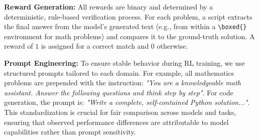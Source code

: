 \textbf{Reward Generation:} All rewards are binary and determined by a deterministic, rule-based verification process. For each problem, a script extracts the final answer from the model's generated text (e.g., from within a \texttt{\textbackslash boxed\{\}} environment for math problems) and compares it to the ground-truth solution. A reward of $1$ is assigned for a correct match and $0$ otherwise. 

\textbf{Prompt Engineering:} To ensure stable behavior during RL training, we use structured prompts tailored to each domain. For example, all mathematics problems are prepended with the instruction: \textit{"You are a knowledgeable math assistant. Answer the following questions and think step by step"}. For code generation, the prompt is: \textit{"Write a complete, self-contained Python solution..."}. This standardization is crucial for fair comparison across models and tasks, ensuring that observed performance differences are attributable to model capabilities rather than prompt sensitivity.
